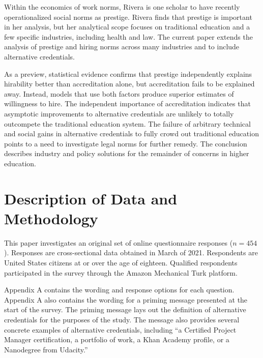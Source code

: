 \documentclass[review]{elsarticle}
\begin{document}
Within the economics of work norms, Rivera is one scholar to have recently operationalized social norms as prestige\cite{rivera2016pedigree}.
Rivera finds that prestige is important in her analysis, but her analytical scope focuses on traditional education and a few specific industries, including health and law.
The current paper extends the analysis of prestige and hiring norms
across many industries and to include alternative credentials.

As a preview, statistical evidence confirms that prestige independently explains hirability better than accreditation alone,
but accreditation fails to be explained away.
Instead, models that use both factors produce superior estimates of willingness to hire.
The independent importance of accreditation indicates that asymptotic improvements to alternative credentials are unlikely to totally outcompete the traditional education system.
The failure of arbitrary technical and social gains in alternative credentials to fully crowd out traditional education
points to a need to investigate legal norms for further remedy.
The conclusion describes industry and policy solutions for the remainder of concerns in higher education.

\section{Description of Data and Methodology}

This paper investigates an original set of online questionnaire responses ($n = 454$).
Responses are cross-sectional data obtained in March of 2021.
Respondents are United States citizens at or over the age of eighteen.
Qualified respondents participated in the survey through the Amazon Mechanical Turk platform.

Appendix A contains the wording and response options for each question.
Appendix A also contains the wording for a priming message presented at the start of the survey.
The priming message lays out the definition of alternative credentials for the purposes of the study.
The message also provides several concrete examples of alternative credentials,
including ``a Certified Project Manager certification,
a portfolio of work, a Khan Academy profile, or a Nanodegree from Udacity.''
\end{document}
